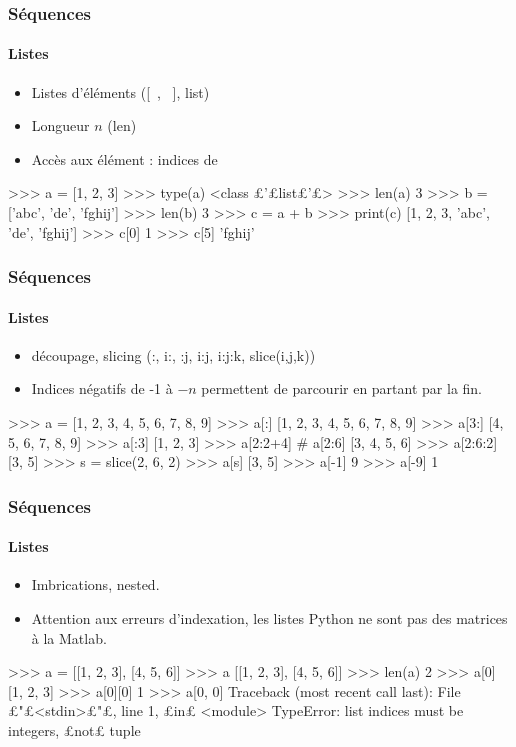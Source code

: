 \begin{frame}[fragile]
\frametitle{Séquences}
\framesubtitle{Listes}
\begin{itemize}
 \item Listes d'éléments ([\ , \ ], list)
 \item Longueur $n$ (len)
 \item Accès aux élément : indices de \color{red}{0 à $n-1$}
\end{itemize}
\begin{pythonConsole}
>>> a = [1, 2, 3]
>>> type(a)
<class £'£list£'£>
>>> len(a)
3
>>> b = ['abc', 'de', 'fghij']
>>> len(b)
3
>>> c = a + b
>>> print(c)
[1, 2, 3, 'abc', 'de', 'fghij']
>>> c[0]
1
>>> c[5]
'fghij'
\end{pythonConsole}
\end{frame}
\begin{frame}[fragile]
\frametitle{Séquences}
\framesubtitle{Listes}
\begin{itemize}
 \item découpage, slicing (:, i:, :j, i:j, i:j:k, slice(i,j,k))
 \item Indices négatifs de -1 à $-n$ permettent de parcourir en partant par la fin. 
\end{itemize}
\begin{pythonConsole}
>>> a = [1, 2, 3, 4, 5, 6, 7, 8, 9]
>>> a[:]
[1, 2, 3, 4, 5, 6, 7, 8, 9]
>>> a[3:]
[4, 5, 6, 7, 8, 9]
>>> a[:3]
[1, 2, 3]
>>> a[2:2+4] # a[2:6]
[3, 4, 5, 6]
>>> a[2:6:2]
[3, 5]
>>> s = slice(2, 6, 2)
>>> a[s]
[3, 5]
>>> a[-1]
9 
>>> a[-9]
1 
\end{pythonConsole}
\end{frame}
\begin{frame}[fragile]
\frametitle{Séquences}
\framesubtitle{Listes}
\begin{itemize}
 \item Imbrications, nested.
 \item Attention aux erreurs d'indexation, les listes Python ne sont pas des matrices à la Matlab. 
\end{itemize}
\begin{pythonConsole}
>>> a = [[1, 2, 3], [4, 5, 6]]
>>> a
[[1, 2, 3], [4, 5, 6]]
>>> len(a)
2
>>> a[0]
[1, 2, 3]
>>> a[0][0]
1
>>> a[0, 0]
Traceback (most recent call last):
  File £"£<stdin>£"£, line 1, £in£ <module>
TypeError: list indices must be integers, £not£ tuple
\end{pythonConsole}
\end{frame}
